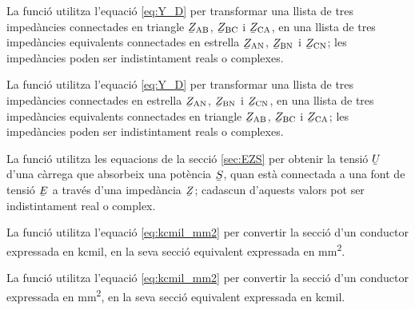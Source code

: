 


La funció  utilitza l'equació \eqref{eq:Y_D} per transformar una llista de tres impedàncies connectades en triangle $\cmplx{Z}\ped{AB}$, $\cmplx{Z}\ped{BC}$ i  $\cmplx{Z}\ped{CA}$, en una llista de tres impedàncies equivalents connectades en estrella $\cmplx{Z}\ped{AN}$, $\cmplx{Z}\ped{BN}$ i $\cmplx{Z}\ped{CN}$; les impedàncies poden ser indistintament reals o complexes.




La funció  utilitza l'equació \eqref{eq:Y_D} per transformar una llista de tres impedàncies connectades en estrella $\cmplx{Z}\ped{AN}$, $\cmplx{Z}\ped{BN}$ i $\cmplx{Z}\ped{CN}$, en una llista de tres impedàncies equivalents connectades en triangle $\cmplx{Z}\ped{AB}$, $\cmplx{Z}\ped{BC}$ i  $\cmplx{Z}\ped{CA}$; les impedàncies poden ser indistintament reals o complexes.




La funció  utilitza les equacions de la secció \vref{sec:EZS} per obtenir la tensió $\cmplx{U}$ d'una càrrega que absorbeix una potència $\cmplx{S}$, quan està connectada a una font de tensió $\cmplx{E}$ a través d'una impedància $\cmplx{Z}$; cadascun d'aquests valors pot ser indistintament real o complex.




La funció  utilitza l'equació \eqref{eq:kcmil_mm2} per convertir la secció d'un conductor expressada en \unit{kcmil}, en la seva secció equivalent expressada en \unit{mm^2}.




La funció  utilitza l'equació \eqref{eq:kcmil_mm2} per convertir la secció d'un conductor expressada en \unit{mm^2}, en la seva secció equivalent expressada en \unit{kcmil}.

